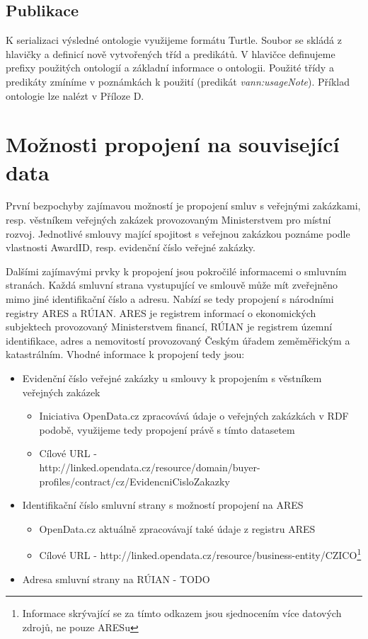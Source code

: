\subsection{Publikace}
\label{sec:kap423}

K serializaci výsledné ontologie využijeme formátu Turtle. Soubor se skládá z hlavičky a definicí nově vytvořených tříd a predikátů. V hlavičce definujeme prefixy použitých ontologií a základní informace o ontologii. Použité třídy a predikáty zmíníme v poznámkách k použití (predikát \textit{vann:usageNote}). Příklad ontologie lze nalézt v Příloze D.

\section{Možnosti propojení na související data}

První bezpochyby zajímavou možností je propojení smluv s veřejnými zakázkami, resp. věstníkem veřejných zakázek provozovaným Ministerstvem pro místní rozvoj. Jednotlivé smlouvy mající spojitost s veřejnou zakázkou poznáme podle vlastnosti AwardID, resp. evidenční číslo veřejné zakázky.  

Dalšími zajímavými prvky k propojení jsou pokročilé informacemi o smluvním stranách. Každá smluvní strana vystupující ve smlouvě může mít zveřejněno mimo jiné identifikační číslo a adresu. Nabízí se tedy propojení s národními registry ARES a RÚIAN. ARES je registrem informací o ekonomických subjektech provozovaný Ministerstvem financí, RÚIAN je registrem územní identifikace, adres a nemovitostí provozovaný Českým úřadem zeměměřickým a katastrálním. Vhodné informace k propojení tedy jsou:

\begin{itemize}
\item Evidenční číslo veřejné zakázky u smlouvy k propojením s věstníkem veřejných zakázek
	\begin{itemize}
	\item Iniciativa OpenData.cz zpracovává údaje o veřejných zakázkách v RDF podobě, využijeme tedy propojení právě s tímto datasetem 
	\item Cílové URL -\\http://linked.opendata.cz/resource/domain/buyer-profiles/contract/cz/{EvidencniCisloZakazky}
	\end{itemize}
\item Identifikační číslo smluvní strany s možností propojení na ARES
	\begin{itemize}
	\item OpenData.cz aktuálně zpracovávají také údaje z registru ARES
	\item Cílové URL - http://linked.opendata.cz/resource/business-entity/CZ{ICO}\footnote{Informace skrývající se za tímto odkazem jsou sjednocením více datových zdrojů, ne pouze ARESu} 
	\end{itemize}
\item Adresa smluvní strany na RÚIAN - TODO
\end{itemize}

